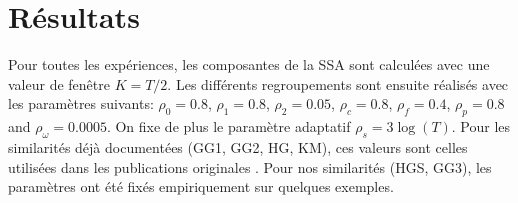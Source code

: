 \documentclass{gretsi}
\newcommand{\set}[1]{\left \{ 1, \dots, #1 \right \}}
\begin{document}


    
       
\vspace{-.4cm}
\section{Résultats}
\label{sec:res}
\vspace{-.2cm}


Pour toutes les expériences, les composantes de la SSA sont calculées avec une valeur de fenêtre $K=T/2$.
Les différents regroupements sont ensuite réalisés avec les paramètres suivants: $\rho_0=0.8$, $\rho_1=0.8$, $\rho_2=0.05$, $\rho_c=0.8$, $\rho_f=0.4$, $\rho_p=0.8$ and $\rho_\omega=0.0005$. On fixe de plus le paramètre adaptatif $\rho_s=3\log(T)$.
Pour les similarités déjà documentées (GG1, GG2, HG, KM), ces valeurs sont celles utilisées dans les publications originales \cite{abalov_14_auto, alvarez_13_auto}. Pour nos similarités (HGS, GG3), les paramètres ont été fixés empiriquement sur quelques exemples.
\end{document}
